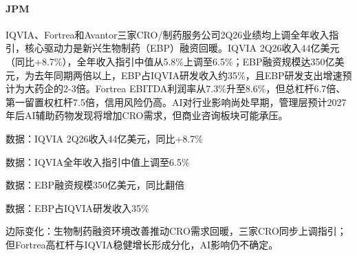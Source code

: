 \documentclass[11pt]{ctexart}
\begin{document}
\paragraph{JPM} IQVIA、Fortrea和Avantor三家CRO/制药服务公司2Q26业绩均上调全年收入指引，核心驱动力是新兴生物制药（EBP）融资回暖。IQVIA 2Q26收入44亿美元（同比+8.7\%），全年收入指引中值从5.8\%上调至6.5\%；EBP融资规模达350亿美元，为去年同期两倍以上，EBP占IQVIA研发收入约35\%，且EBP研发支出增速预计为大药企的2-3倍。Fortrea EBITDA利润率从7.3\%升至8.6\%，但总杠杆6.7倍、第一留置权杠杆7.5倍，信用风险仍高。AI对行业影响尚处早期，管理层预计2027年后AI辅助药物发现将增加CRO需求，但商业咨询板块可能承压。
{\small\color{refgray}数据：IQVIA 2Q26收入44亿美元，同比+8.7\%\par}
{\small\color{refgray}数据：IQVIA全年收入指引中值上调至6.5\%\par}
{\small\color{refgray}数据：EBP融资规模350亿美元，同比翻倍\par}
{\small\color{refgray}数据：EBP占IQVIA研发收入35\%\par}
{\small\color{refgray}边际变化：生物制药融资环境改善推动CRO需求回暖，三家CRO同步上调指引；但Fortrea高杠杆与IQVIA稳健增长形成分化，AI影响仍不确定。\par}
\end{document}
